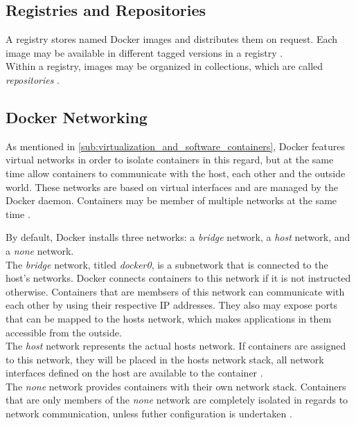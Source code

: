 
  \subsection{Registries and Repositories} %
  \label{sub:registries_and_repositories}
    A registry stores named Docker images and distributes them on request. Each image may be available in different tagged versions in a registry \cite{Docker????Dockera}. \\
    Within a registry, images may be organized in collections, which are called \emph{repositories} \cite{Docker????Docker}.


  \subsection{Docker Networking} %
  \label{sub:docker_networks}
    As mentioned in \ref{sub:virtualization_and_software_containers}, Docker features virtual networks in order to isolate containers in this regard, but at the same time allow containers to communicate with the host, each other and the outside world. These networks are based on virtual interfaces and are managed by the Docker daemon. Containers may be member of multiple networks at the same time \cite{Docker????Dockera}.

    By default, Docker installs three networks: a \emph{bridge} network, a \emph{host} network, and a \emph{none} network. \\
    The \emph{bridge} network, titled \emph{docker0}, is a subnetwork that is connected to the host's networks. Docker connects containers to this network if it is not instructed otherwise. Containers that are membsers of this network can communicate with each other by using their respective \ac{IP} addresses. They also may expose ports that can be mapped to the hosts network, which makes applications in them accessible from the outside. \\
    The \emph{host} network represents the actual hosts network. If containers are assigned to this network, they will be placed in the hosts network stack, \ie all network interfaces defined on the host are available to the container \cite{Docker????Dockera}. \\
    The \emph{none} network provides containers with their own network stack. Containers that are only members of the \emph{none} network are completely isolated in regards to network communication, unless futher configuration is undertaken \cite{Docker????Dockera}.

